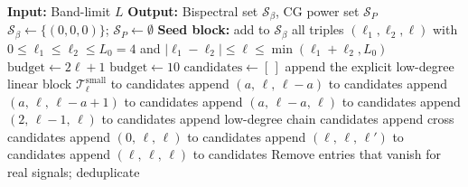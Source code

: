 \documentclass{article}
\theoremstyle{definition}
\theoremstyle{remark}
\newcommand{\SO}{\mathrm{SO}}
\theoremstyle{definition}
\begin{document}
\begin{algorithm}[H]
\caption{Augmented selective index set for the $\SO(3)$ bispectrum
  on $S^2$ at band-limit~$L$. Returns bispectral triples
  $\mathcal{S}_\beta$ and CG power triples $\mathcal{S}_P$.
  This extends the BFS-based selective index construction of
  \citet{mataigne2024selective} from finite groups to $\SO(3)$ on $S^2$,
  adding the CG power augmentation step that is specific to real
  signals.}
\label{alg:so3-augmented}
\small
\begin{algorithmic}[1]
\STATE \textbf{Input:} Band-limit $L$
\STATE \textbf{Output:} Bispectral set $\mathcal{S}_\beta$, CG power
  set $\mathcal{S}_P$
\STATE $\mathcal{S}_\beta \leftarrow \{(0,0,0)\}$;
  $\mathcal{S}_P \leftarrow \emptyset$
\STATE \textbf{Seed block:} add to $\mathcal{S}_\beta$ all triples
  $(\ell_1, \ell_2, \ell)$ with $0 \le \ell_1 \le \ell_2 \le L_0 = 4$
  and $|\ell_1 - \ell_2| \le \ell \le \min(\ell_1 + \ell_2, L_0)$
  \STATE $\text{budget} \leftarrow 2\ell + 1$
    \STATE $\text{budget} \leftarrow 10$
  \ENDIF
  \STATE $\text{candidates} \leftarrow [\,]$
    \STATE append the explicit low-degree linear block
      $\mathcal{T}^{\mathrm{small}}_\ell$ to candidates
      \STATE append $(a,\, \ell,\, \ell{-}a)$ to candidates
    \ENDFOR
        \STATE append $(a,\, \ell,\, \ell{-}a{+}1)$ to candidates
      \ENDIF
    \ENDFOR
      \STATE append $(a,\, \ell{-}a,\, \ell)$ to candidates
    \ENDFOR
      \STATE append $(2,\, \ell{-}1,\, \ell)$ to candidates
    \ENDIF
  \ELSE
    \STATE append low-degree chain candidates
      \STATE append cross candidates
    \ENDIF
  \ENDIF
  \STATE append $(0,\, \ell,\, \ell)$ to candidates
      \STATE append $(\ell,\, \ell,\, \ell')$ to candidates
    \ENDFOR
  \ENDIF
    \STATE append $(\ell,\, \ell,\, \ell)$ to candidates
  \ENDIF
  \STATE Remove entries that vanish for real signals; deduplicate

\end{algorithmic}
\end{algorithm}
\end{document}
